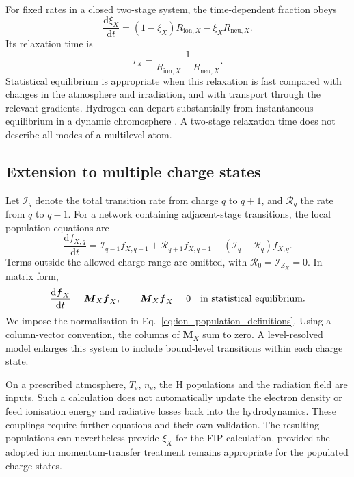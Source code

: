 For fixed rates in a closed two-stage system, the time-dependent fraction obeys
\begin{equation}
 \frac{\mathrm d\xi_X}{\mathrm dt}
 =(1-\xi_X)R_{\mathrm{ion},X}
 -\xi_X R_{\mathrm{neu},X}.
 \label{eq:ion_time_two}
\end{equation}
Its relaxation time is
\begin{equation}
 \tau_X=\frac{1}{R_{\mathrm{ion},X}+R_{\mathrm{neu},X}}.
 \label{eq:ion_relaxation}
\end{equation}
Statistical equilibrium is appropriate when this relaxation is fast compared
with changes in the atmosphere and irradiation, and with transport through
the relevant gradients. Hydrogen can depart substantially from instantaneous
equilibrium in a dynamic chromosphere \cite{carlsson2002}.
A two-stage relaxation time does not describe all modes of a multilevel atom.

\subsection{Extension to multiple charge states}
\label{subsec:ion_multistage}

Let \(\mathcal I_q\) denote the total transition rate from charge \(q\) to
\(q+1\), and \(\mathcal R_q\) the rate from \(q\) to \(q-1\).
For a network containing adjacent-stage transitions, the local population
equations are
\begin{equation}
 \frac{\mathrm d f_{X,q}}{\mathrm dt}
 =\mathcal I_{q-1}f_{X,q-1}
  +\mathcal R_{q+1}f_{X,q+1}
  -(\mathcal I_q+\mathcal R_q)f_{X,q}.
 \label{eq:ion_multistage}
\end{equation}
Terms outside the allowed charge range are omitted, with
\(\mathcal R_0=\mathcal I_{Z_X}=0\).
In matrix form,
\begin{equation}
 \frac{\mathrm d\boldsymbol f_X}{\mathrm dt}
 =\boldsymbol M_X\boldsymbol f_X,
 \qquad
 \boldsymbol M_X\boldsymbol f_X=0
 \quad\hbox{in statistical equilibrium}.
 \label{eq:ion_rate_matrix}
\end{equation}
We impose the normalisation in Eq.~\eqref{eq:ion_population_definitions}.
Using a column-vector convention, the columns of \(\boldsymbol M_X\) sum to
zero. A level-resolved model enlarges this system to include bound-level
transitions within each charge state.

On a prescribed atmosphere, \(T_{\mathrm e}\), \(n_{\mathrm e}\), the H
populations and the radiation field are inputs. Such a calculation does not
automatically update the electron density or feed ionisation energy and
radiative losses back into the hydrodynamics. These couplings require further
equations and their own validation. The resulting populations can nevertheless
provide \(\xi_X\) for the FIP calculation, provided the adopted ion
momentum-transfer treatment remains appropriate for the populated charge states.
